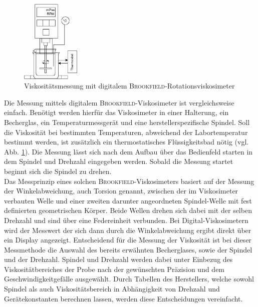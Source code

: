 
\begin{figure}[h!]
	\centering
	\includegraphics[width=0.25\textwidth]{img/viskosimeter}
	\caption{Viskositätsmessung mit digitalem \textsc{Brookfield}-Rotationsviskosimeter}
	\label{fig: viskosimeter}
\end{figure}
\FloatBarrier

Die Messung mittels digitalem \textsc{Brookfield}-Viskosimeter ist vergleichsweise einfach. Benötigt werden hierfür das Viskosimeter in einer Halterung, ein Becherglas, ein Temperaturmessgerät und eine herstellerspezifische Spindel. Soll die Viskosität bei bestimmten Temperaturen, abweichend der Labortemperatur bestimmt werden, ist zusätzlich ein thermostatisches Flüssigkeitsbad nötig (vgl. Abb. \ref{fig: viskosimeter}). Die Messung lässt sich nach dem Aufbau über das Bedienfeld starten in dem Spindel und Drehzahl eingegeben werden. Sobald die Messung startet beginnt sich die Spindel zu drehen.\\
Das Messprinzip eines solchen \textsc{Brookfield}-Viskosimeters basiert auf der Messung der Winkelabweichung, auch Torsion genannt, zwischen der im Viskosimeter verbauten Welle und einer zweiten darunter angeordneten Spindel-Welle mit fest definierten geometrischen Körper. Beide Wellen drehen sich dabei mit der selben Drehzahl  und sind über eine Federeinheit verbunden. Bei Digital-Viskosimetern wird der Messwert der sich dann durch die Winkelabweichung ergibt direkt über ein Display angezeigt.\linebreak
Entscheidend für die Messung der Viskosität ist bei dieser Messmethode die Auswahl des bereits erwähnten Becherglases, sowie der Spindel und der Drehzahl. Spindel und Drehzahl werden dabei unter Einbezug des Viskositätbereiches der Probe nach der gewünschten Präzision und dem Geschwindigkeitgefälle ausgewählt. \cite{DINDeutschesInstitutfurNormunge.V..September2018} 
Durch Tabellen des Herstellers, welche sowohl Spindel als auch Viskositätsbereich in Abhängigkeit von Drehzahl und Gerätekonstanten berechnen lassen, werden diese Entscheidungen vereinfacht. \cite{brookfield.2007}

